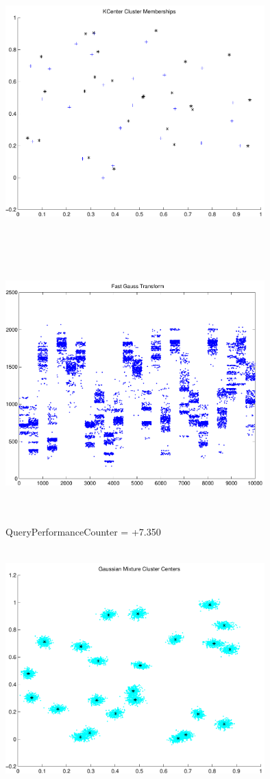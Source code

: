\documentclass[9pt]{article}
\theoremstyle{plain}
\theoremstyle{definition}
\theoremstyle{remark}
\numberwithin{equation}{section}
\begin{document}
\includegraphics[width=10.0cm,height=10.0cm]{KCenterClusterMemberships_25_Centers.pdf}

\includegraphics[width=10.0cm,height=10.0cm]{FGT25_Centers.pdf}

QueryPerformanceCounter  =  +7.350
\includegraphics[width=10.0cm,height=10.0cm]{GaussianMixture_ClusterCenters24_Centers.pdf}
\end{document}
